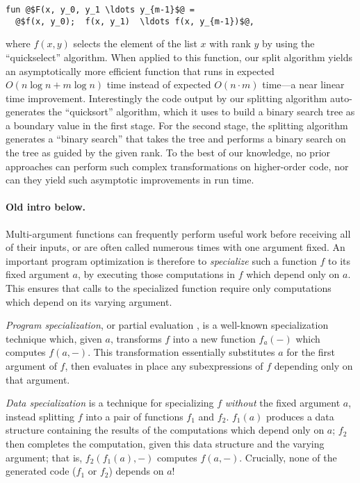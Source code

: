 \begin{lstlisting}
fun @$F(x, y_0, y_1 \ldots y_{m-1}$@ = 
  @$f(x, y_0);  f(x, y_1)  \ldots f(x, y_{m-1})$@,
\end{lstlisting}
where $f(x,y)$ selects the element of the list $x$ with rank $y$ by
using the ``quickselect'' algorithm.  When applied to this function,
our split algorithm yields an asymptotically more efficient function
that runs in expected $O(n\log{n} + m\log{n})$ time instead of
expected $O(n \cdot m)$ time---a near linear time improvement.
Interestingly the code output by our splitting algorithm
auto-generates the ``quicksort'' algorithm, which it uses to build a
binary search tree as a boundary value in the first stage.  For the
second stage, the splitting algorithm generates a ``binary search''
that takes the tree and performs a binary search on the tree as guided
by the given rank.  To the best of our knowledge, no prior approaches
can perform such complex transformations on higher-order code, nor can
they yield such asymptotic improvements in run time.

\paragraph{Old intro below.}

Multi-argument functions can frequently perform useful work before receiving all
of their inputs, or are often called numerous times with one argument fixed. An
important program optimization is therefore to \emph{specialize} such a function
$f$ to its fixed argument $a$, by executing those computations in $f$ which
depend only on $a$. This ensures that calls to the specialized function require
only computations which depend on its varying argument.

\emph{Program specialization}, or partial evaluation \cite{futamura71,jones96},
is a well-known specialization technique which, given $a$, transforms $f$ into a
new function $f_a(-)$ which computes $f(a,-)$. This transformation essentially
substitutes $a$ for the first argument of $f$, then evaluates in place any
subexpressions of $f$ depending only on that argument.

\emph{Data specialization} \cite{knoblock96,JS86-staging} 
is a technique for specializing $f$ \emph{without} the fixed argument $a$,
instead splitting $f$ into a pair of functions $f_1$ and $f_2$. $f_1(a)$
produces a data structure containing the results of the computations which
depend only on $a$; $f_2$ then completes the computation, given this data
structure and the varying argument; that is, $f_2(f_1(a),-)$ computes $f(a,-)$.
Crucially, none of the generated code ($f_1$ or $f_2$) depends on $a$!

